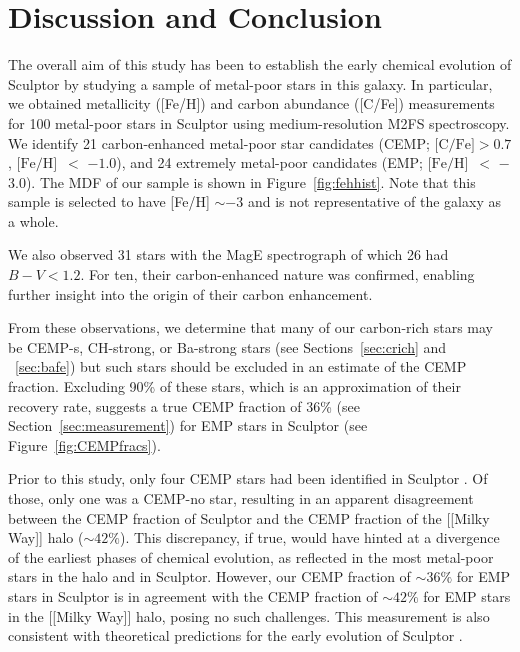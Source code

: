 \documentclass{emulateapj-rtx4}
\newcommand{\feh}{$\mbox{[Fe/H]}$}
\begin{document}
\section{Discussion and Conclusion}
\label{sec:discussion}

The overall aim of this study has been to establish the early chemical evolution of Sculptor by studying
a sample of metal-poor stars in this galaxy. In particular, we obtained metallicity ([Fe/H]) and 
carbon abundance ([C/Fe]) measurements for 100 metal-poor stars in Sculptor using medium-resolution 
M2FS spectroscopy. We identify 21 carbon-enhanced metal-poor star candidates 
(CEMP; $\mbox{[C/Fe]} > 0.7$, \feh\, $<$ $-1.0$), and 24 extremely metal-poor 
candidates (EMP; \feh\, $<$ $-$3.0). The MDF of our sample is shown in Figure~\ref{fig:fehhist}.
Note that this sample is selected to have [Fe/H] $\sim -3$ and is not representative of the galaxy as a whole.

We also observed 31 stars with the MagE spectrograph of which 26 had $B-V < 1.2$. 
For ten, their carbon-enhanced nature was confirmed, enabling further insight into the origin of their carbon enhancement.

From these observations, we determine that many of our carbon-rich stars may be CEMP-s, CH-strong, or Ba-strong stars (see Sections~\ref{sec:crich} and ~\ref{sec:bafe}) but such stars should be excluded in an estimate of the CEMP fraction. Excluding 90\% of these stars, which is an approximation of their recovery rate, 
suggests a true CEMP fraction of 36\% (see Section~\ref{sec:measurement})
for EMP stars in Sculptor (see Figure~\ref{fig:CEMPfracs}).

Prior to this study, only four CEMP stars had been identified in Sculptor \citep{sts+15,lbp+16,sdy+16}. 
Of those, only one was a CEMP-no star, resulting in an apparent disagreement between the CEMP fraction
of Sculptor and the CEMP fraction of the [[Milky Way]] halo ($\sim42\%$). This discrepancy, if true, would have hinted at  
a divergence of the earliest phases of chemical evolution, as reflected in the most metal-poor stars
in the halo and in Sculptor. However, our CEMP fraction of $\sim36\%$ for EMP stars in Sculptor is in agreement with the CEMP
fraction of $\sim42\%$ for EMP stars in the [[Milky Way]] halo, posing
no such challenges.
This measurement is also consistent with theoretical predictions for the early evolution of Sculptor \citep{sst+15}.
\end{document}
